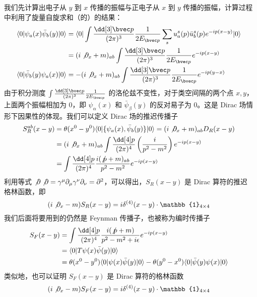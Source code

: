 
我们先计算出电子从 $y$ 到 $x$ 传播的振幅与正电子从 $x$ 到 $y$ 传播的振幅，计算过程中利用了旋量自旋求和（的）的结果：
\begin{equation}
\begin{aligned}
\langle 0 | \psi_a(x) \bar\psi_b(y)|0\rangle &= \langle 0|\int \frac{\dd[3] \bvec p}{(2\pi)^3} \frac{1}{2E_{\bvec p}}\sum_s u^s_a(p)\bar u^s_b(p) e^{-ip(x-y)} |0\rangle\\
&=(i\not \partial_x+m)_{ab}\int \frac{\dd[3] \bvec p}{(2\pi)^3}\frac{1}{2E_{\bvec p}}e^{-ip(x-y)}\\
\langle 0 | \bar\psi_b(y) \psi_a(x)|0\rangle &=-(i\not\partial_x +m)_{ab}\int \frac{\dd[3] \bvec p}{(2\pi)^3}\frac{1}{2E_{\bvec p}}e^{-ip(y-x)}
\end{aligned}
\end{equation}
由于积分测度 $\int \frac{\dd[3]\bvec  p}{(2\pi)^3}\frac{1}{2E_{\bvec p}}$ 的洛伦兹不变性，对于类空间隔的两个点 $x,y$，上面两个振幅相加为 $0$，即 $\psi_\alpha(x)$ 和 $\bar\psi_\beta(y)$ 的反对易子为 $0$。这是 Dirac 场情形下因果性的体现。我们可以定义 Dirac 场的推迟传播子
\begin{align*}
S^{ab}_R(x-y)&=\theta(x^0-y^0) \langle 0| \{\psi_a(x),\bar\psi_b(y) \} | 0\rangle = (i\not \partial_x+m)_{ab} D_R(x-y)\\
&=(i\not\partial_x+m)_{ab}\int \frac{\dd[4] p}{(2\pi)^4}\left(\frac{i}{p^2-m^2}\right)e^{-ip(x-y)}\\
&=\int \frac{\dd[4] p}{(2\pi)^4}\frac{i(\not p+m)_{ab}}{p^2-m^2}e^{-ip(x-y)}
\end{align*}
利用等式 $\not \partial \not \partial=\gamma^\mu\partial_\mu\gamma^\nu\partial_\nu=\partial^2$，可以得出，$S_R(x-y)$ 是 Dirac 算符的推迟格林函数，即
\[
(i\not \partial_x-m)S_R(x-y) = i\delta^{(4)}(x-y) \cdot \mathbb{1}_{4\times 4}
\]
我们后面将要用到的仍然是 Feynman 传播子，也被称为编时传播子
\begin{equation}
\begin{aligned}
S_F(x-y)&=\int \frac{\dd[4] p}{(2\pi)^4}\frac{i(\not p+m)}{p^2-m^2+i\epsilon}e^{-ip(x-y)}\\
\notag&=\langle 0|T\psi(x)\bar\psi(y)|0\rangle \\
\notag&=\theta(x^0-y^0) \langle 0|\psi(x)\bar\psi(y) |0\rangle -\theta(y^0-x^0)\langle 0|\bar\psi(y)\psi(x)|0\rangle
\end{aligned}
\end{equation}
类似地，也可以证明 $S_F(x-y)$ 是 Dirac 算符的格林函数
\[
(i\not \partial_x-m)S_F(x-y) = i\delta^{(4)}(x-y) \cdot \mathbb{1}_{4\times 4}
\]